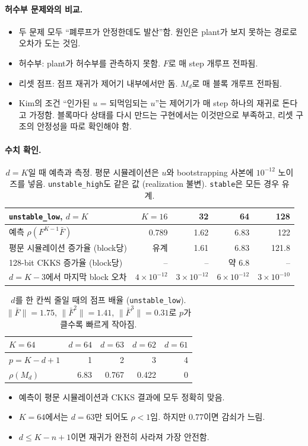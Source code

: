 \documentclass[11pt,a4paper]{article}
\newcommand{\Fb}{\bar F}
\begin{document}
\paragraph{허수부 문제와의 비교.}
\begin{itemize}
\item 두 문제 모두 ``폐루프가 안정한데도 발산''함. 원인은 plant가 보지 못하는 경로로 오차가 도는 것임.
\item 허수부: plant가 허수부를 관측하지 못함. $F$로 매 step 개루프 전파됨.
\item 리셋 점프: 점프 재귀가 제어기 내부에서만 돔. $M_d$로 매 블록 개루프 전파됨.
\item Kim의 조건 ``인가된 $u$ = 되먹임되는 $u$''는 제어기가 매 step 하나의 재귀로 돈다고 가정함.
      블록마다 상태를 다시 만드는 구현에서는 이것만으로 부족하고, 리셋 구조의 안정성을 따로 확인해야 함.
\end{itemize}

\paragraph{수치 확인.}
\begin{table}[H]
\centering
\begin{tabular}{lrrrr}
\toprule
\texttt{unstable\_low}, $d=K$ & $K=16$ & 32 & 64 & 128 \\
\midrule
예측 $\rho(F^{K-1}\Fb)$ & 0.789 & 1.62 & 6.83 & 122 \\
평문 시뮬레이션 증가율 (block당) & 유계 & 1.61 & 6.83 & 121.8 \\
128-bit CKKS 증가율 (block당) & -- & -- & 약 6.8 & -- \\
\midrule
$d=K-3$에서 마지막 block 오차 & $4\times10^{-12}$ & $3\times10^{-12}$ & $6\times10^{-12}$ & $3\times10^{-10}$ \\
\bottomrule
\end{tabular}
\caption{$d=K$일 때 예측과 측정. 평문 시뮬레이션은 $u$와 bootstrapping 사본에 $10^{-12}$ 노이즈를 넣음. \texttt{unstable\_high}도 같은 값 (realization 불변). \texttt{stable}은 모든 경우 유계.}
\label{tab:dstab}
\end{table}

\begin{table}[H]
\centering
\begin{tabular}{lrrrr}
\toprule
$K=64$ & $d=64$ & $d=63$ & $d=62$ & $d=61$ \\
\midrule
$p=K-d+1$ & 1 & 2 & 3 & 4 \\
$\rho(M_d)$ & 6.83 & 0.767 & 0.422 & 0 \\
\bottomrule
\end{tabular}
\caption{$d$를 한 칸씩 줄일 때의 점프 배율 (\texttt{unstable\_low}). $\|\Fb\|=1.75$, $\|\Fb^2\|=1.41$, $\|\Fb^3\|=0.31$로 $p$가 클수록 빠르게 작아짐.}
\label{tab:dscan}
\end{table}
\begin{itemize}
\item 예측이 평문 시뮬레이션과 CKKS 결과에 모두 정확히 맞음.
\item $K=64$에서는 $d=63$만 되어도 $\rho<1$임. 하지만 0.77이면 감쇠가 느림.
\item $d\le K-n+1$이면 재귀가 완전히 사라져 가장 안전함.
\end{itemize}
\end{document}
